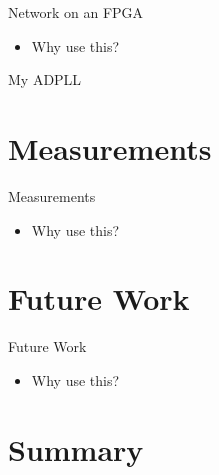 \documentclass{beamer}
\begin{document}
\begin{frame}{Network on an FPGA}

    \begin{itemize}
        \item
            Why use this?
    \end{itemize}
 
\end{frame}

\begin{frame}{My ADPLL}

     
\end{frame}

\section*{Measurements}
\begin{frame}{Measurements}

    \begin{itemize}
        \item
            Why use this?
    \end{itemize}
 
\end{frame}

\section*{Future Work}

\begin{frame}{Future Work}

    \begin{itemize}
        \item
            Why use this?
    \end{itemize}
 
\end{frame}

\section*{Summary}
\end{document}
